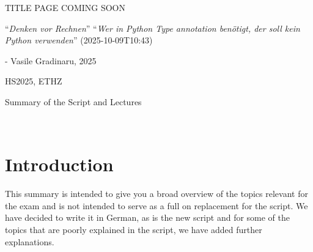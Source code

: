 \documentclass{article}
\begin{document}
\startDocument
\usetcolorboxes
\setcounter{numberingConfig}{3}
\setcounter{numberSubsections}{1}

\vspace{2cm}
\begin{Huge}
    \begin{center}
        TITLE PAGE COMING SOON
    \end{center}
\end{Huge}


\vspace{4cm}
\begin{center}
    \begin{Large}
        ``\textit{Denken vor Rechnen}''
        ``\textit{Wer in Python Type annotation benötigt, der soll kein Python verwenden}'' (2025-10-09T10:43)
    \end{Large}

    \hspace{3cm} - Vasile Gradinaru, 2025
\end{center}

\vspace{3cm}
\begin{center}
    HS2025, ETHZ\\[0.2cm]
    \begin{Large}
        Summary of the Script and Lectures
    \end{Large}\\[0.2cm]
\end{center}



\newpage
{}



\newpage
\setcounter{section}{-1}
\section{Introduction}
This summary is intended to give you a broad overview of the topics relevant for the exam and is not intended to serve as a full on replacement for the script.
We have decided to write it in German, as is the new script and for some of the topics that are poorly explained in the script, we have added further explanations.
\end{document}
